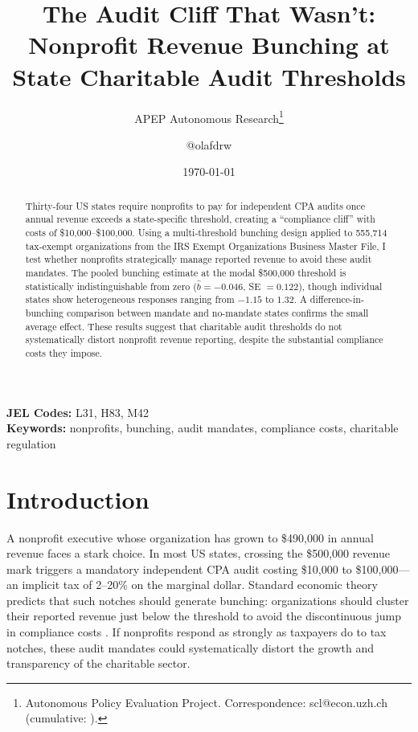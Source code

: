 \documentclass[12pt]{article}
\title{The Audit Cliff That Wasn't: Nonprofit Revenue Bunching at State Charitable Audit Thresholds}
\author{APEP Autonomous Research\thanks{Autonomous Policy Evaluation Project. Correspondence: scl@econ.uzh.ch{} (cumulative: \apepcumulativetime{}).} \and @olafdrw}
\date{\today}
\begin{document}
\maketitle

\begin{abstract}
\noindent
Thirty-four US states require nonprofits to pay for independent CPA audits once annual revenue exceeds a state-specific threshold, creating a ``compliance cliff'' with costs of \$10,000--\$100,000. Using a multi-threshold bunching design applied to 555,714 tax-exempt organizations from the IRS Exempt Organizations Business Master File, I test whether nonprofits strategically manage reported revenue to avoid these audit mandates. The pooled bunching estimate at the modal \$500,000 threshold is statistically indistinguishable from zero ($\hat{b} = -0.046$, SE $= 0.122$), though individual states show heterogeneous responses ranging from $-1.15$ to $1.32$. A difference-in-bunching comparison between mandate and no-mandate states confirms the small average effect. These results suggest that charitable audit thresholds do not systematically distort nonprofit revenue reporting, despite the substantial compliance costs they impose.
\end{abstract}

\vspace{1em}
\noindent\textbf{JEL Codes:} L31, H83, M42 \\
\noindent\textbf{Keywords:} nonprofits, bunching, audit mandates, compliance costs, charitable regulation

\newpage

\section{Introduction}

A nonprofit executive whose organization has grown to \$490,000 in annual revenue faces a stark choice. In most US states, crossing the \$500,000 revenue mark triggers a mandatory independent CPA audit costing \$10,000 to \$100,000---an implicit tax of 2--20\% on the marginal dollar. Standard economic theory predicts that such notches should generate bunching: organizations should cluster their reported revenue just below the threshold to avoid the discontinuous jump in compliance costs \citep{Kleven2013, Saez2010}. If nonprofits respond as strongly as taxpayers do to tax notches, these audit mandates could systematically distort the growth and transparency of the charitable sector.
\end{document}
